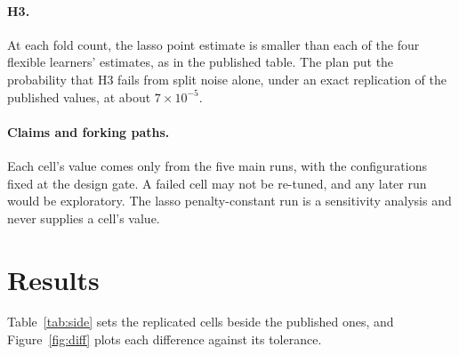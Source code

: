 \documentclass[11pt]{article}
\begin{document}
\paragraph{H3.} At each fold count, the lasso point estimate is smaller than each of the
four flexible learners' estimates, as in the published table. The plan put the
probability that H3 fails from split noise alone, under an exact replication of the
published values, at about $7 \times 10^{-5}$.

\paragraph{Claims and forking paths.} Each cell's value comes only from the five main
runs, with the configurations fixed at the design gate. A failed cell may not be
re-tuned, and any later run would be exploratory. The lasso penalty-constant run is a
sensitivity analysis and never supplies a cell's value.

\section{Results}
\label{sec:results}

Table~\ref{tab:side} sets the replicated cells beside the published ones, and
Figure~\ref{fig:diff} plots each difference against its tolerance.

\begin{table}[t]
\centering
\caption{Published and replicated estimates of the effect of 401(k) eligibility on net
financial assets, all ten cells (DML2 partially linear model, partialling-out score, all
$\NoctrlN$ households of the 1991 SIPP extract; 1991 US dollars). The replicated estimate
is the median over $S$ random splits: $S = 100$ for the lasso, regression tree and neural
network, 40 for the random forest and 30 for boosted trees. Published values are from
\citet[Table~2, Panel~B]{chernozhukov2018dml}. The bracketed SE is the median of the
per-split SEs; the adjusted SE adds the split-to-split variation (eq.~\ref{eq:adj}).
Tolerance is the pre-registered H2 half-width $2.81\sqrt{\text{se}_{\text{rep}}^2 +
\text{se}_{\text{pub}}^2}$; MDS$_{80}$ is the shift a cell detects with 80\% power.
(a)~Inside the tolerance but not testable at this resolution (MDS$_{80}$ exceeds half the
published bracketed SE), so not counted as a pass. The replicated lasso split-to-split
spread is several times narrower than the one the published SEs imply
(Figure~\ref{fig:spread}).
(b)~Pass: $|\text{difference}| \le$ tolerance in a testable cell, meaning no shift larger
than MDS$_{80}$ was detected; smaller shifts are not ruled out. (c)~The forest port failed
the pre-analysis port check (Table~\ref{tab:port}): $\PortShiftForest$ (SE
\PortShiftSeForest) synthetic-outcome dollars, measured at the 2-fold training size only.
Both forest differences lie below the cells' MDS$_{80}$, so neither cell can tell a zero
shift from the measured one.}
\label{tab:side}
{\footnotesize\resizebox{\textwidth}{!}{}}
\end{table}
\end{document}
